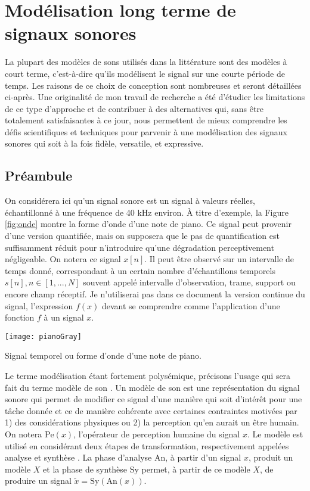 \chapter{\nmu Modélisation long terme de signaux sonores} \label{chap:modeles}

La plupart des modèles de sons utilisés dans la littérature sont des modèles à court terme, c'est-à-dire qu'ils modélisent le signal sur une courte période de temps. Les raisons de ce choix de conception sont nombreuses et seront détaillées ci-après. Une originalité de mon travail de recherche a été d'étudier les limitations de ce type d'approche et de contribuer à des alternatives qui, sans être totalement satisfaisantes à ce jour, nous permettent de mieux comprendre les défis scientifiques et techniques pour parvenir à une modélisation des signaux sonores qui soit à la fois fidèle, versatile, et expressive.

\section{ \nmu Préambule}

On considérera ici qu'un signal sonore est un signal à valeurs réelles, échantillonné à une fréquence de 40 kHz environ. \`A titre d'exemple, la Figure \ref{fig:onde} montre la forme d'onde d'une note de piano. Ce signal peut provenir d'une version quantifiée, mais on supposera que le pas de quantification est suffisamment réduit pour n'introduire qu'une dégradation perceptivement négligeable. On notera ce signal $x[n]$. Il peut être observé sur un intervalle de temps donné, correspondant à un certain nombre d'échantillons temporels $s[n], n \in [1, ..., N]$ souvent appelé intervalle d'observation, trame, support ou encore champ réceptif. Je n'utiliserai pas dans ce document la version continue du signal, l'expression $f(x)$ devant se comprendre comme l'application d'une fonction $f$ à un signal $x$.

\begin{marginfigure}
  \texttt{[image: pianoGray]}
  \caption{Signal temporel ou forme d'onde d'une note de piano.}
  \label{fig:onde}
\end{marginfigure}

Le terme modélisation étant fortement polysémique, précisons l'usage qui sera fait du terme \og modèle de son \fg. Un modèle de son est une représentation du signal sonore qui permet de modifier ce signal d'une manière qui soit d'intérêt pour une tâche donnée et ce de manière cohérente avec certaines contraintes motivées par 1) des considérations physiques ou 2) la perception qu'en aurait un être humain. On notera $\mathrm{Pe}(x)$, l'opérateur de perception humaine du signal $x$.  Le modèle est utilisé en considérant deux étapes de transformation, respectivement appelées \og analyse \fg et \og synthèse \fg. La phase d'analyse $\mathrm{An}$, à partir d'un signal $x$, produit un modèle $X$ et la phase de synthèse $\mathrm{Sy}$ permet, à partir de ce modèle $X$, de produire un signal $\tilde{x}=\mathrm{Sy}(\mathrm{An}(x))$.

